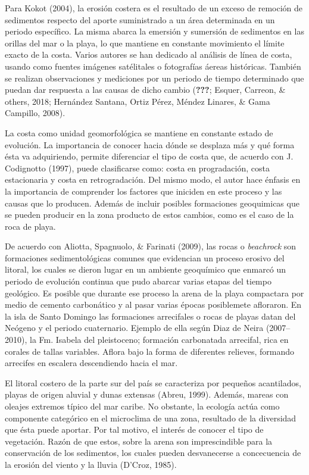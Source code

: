 \documentclass[11pt,]{article}
\begin{document}
Para Kokot (2004), la erosión costera es el resultado de un exceso de
remoción de sedimentos respecto del aporte suministrado a un área
determinada en un periodo específico. La misma abarca la emersión y
sumersión de sedimentos en las orillas del mar o la playa, lo que
mantiene en constante movimiento el límite exacto de la costa. Varios
autores se han dedicado al análisis de línea de costa, usando como
fuentes imágenes satélitales o fotografías áereas históricas. También se
realizan observaciones y mediciones por un periodo de tiempo determinado
que puedan dar respuesta a las causas de dicho cambio ({\textbf{???}};
Esquer, Carreon, \& others, 2018; Hernández Santana, Ortiz Pérez, Méndez
Linares, \& Gama Campillo, 2008).

La costa como unidad geomorfológica se mantiene en constante estado de
evolución. La importancia de conocer hacia dónde se desplaza más y qué
forma ésta va adquiriendo, permite diferenciar el tipo de costa que, de
acuerdo con J. Codignotto (1997), puede clasificarse como: costa en
progradación, costa estacionaria y costa en retrogradación. Del mismo
modo, el autor hace énfasis en la importancia de comprender los factores
que iniciden en este proceso y las causas que lo producen. Además de
incluir posibles formaciones geoquimicas que se pueden producir en la
zona producto de estos cambios, como es el caso de la roca de playa.

De acuerdo con Aliotta, Spagnuolo, \& Farinati (2009), las rocas o
\emph{beachrock} son formaciones sedimentológicas comunes que evidencian
un proceso erosivo del litoral, los cuales se dieron lugar en un
ambiente geoquímico que enmarcó un periodo de evolución continua que
pudo abarcar varias etapas del tiempo geológico. Es posible que durante
ese proceso la arena de la playa compactara por medio de cemento
carbonático y al pasar varias épocas posiblemete afloraron. En la isla
de Santo Domingo las formaciones arrecifales o rocas de playas datan del
Neógeno y el periodo cuaternario. Ejemplo de ella según Diaz de Neira
(2007--2010), la Fm. Isabela del pleistoceno; formación carbonatada
arrecifal, rica en corales de tallas variables. Aflora bajo la forma de
diferentes relieves, formando arrecifes en escalera descendiendo hacia
el mar.

El litoral costero de la parte sur del país se caracteriza por pequeños
acantilados, playas de origen aluvial y dunas extensas (Abreu, 1999).
Además, mareas con oleajes extremos típico del mar caribe. No obstante,
la ecología actúa como componente categórico en el microclima de una
zona, resultado de la diversidad que ésta puede aportar. Por tal motivo,
el interés de conocer el tipo de vegetación. Razón de que estos, sobre
la arena son imprescindible para la conservación de los sedimentos, los
cuales pueden desvanecerse a concecuencia de la erosión del viento y la
lluvia (D'Croz, 1985).
\end{document}
